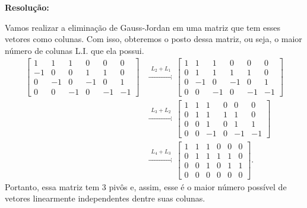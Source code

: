 \documentclass[leqno]{article}
\numberwithin{equation}{section}
\newenvironment{sol}
{
    \vspace{4mm}
    \noindent\textbf{Resolução:}
    \strut\newline
    \smallskip
    \hspace{-3.5mm}
}
{}
\begin{document}
\begin{enumerate}
        \begin{sol} 
            Vamos realizar a eliminação de Gauss-Jordan em uma matriz que tem esses vetores como colunas.
            Com isso, obteremos o posto dessa matriz, ou seja, o maior número de colunas L.I. que ela possui.
            \begin{align*}
                \begin{bmatrix}
                    1 & 1 & 1 & 0 & 0 & 0 \\
                    -1 & 0 & 0 & 1 & 1 & 0 \\
                    0 & -1 & 0 & -1 & 0 & 1 \\
                    0 & 0 & -1 & 0 & -1 & -1
                \end{bmatrix}
                &\xrightarrow{
                    \begin{array}{l}
                        L_{ 2 } + L_{ 1 }
                    \end{array}
                }
                \begin{bmatrix}
                    1 & 1 & 1 & 0 & 0 & 0 \\
                    0 & 1 & 1 & 1 & 1 & 0 \\
                    0 & -1 & 0 & -1 & 0 & 1 \\
                    0 & 0 & -1 & 0 & -1 & -1
                \end{bmatrix} \\
                &\xrightarrow{
                    \begin{array}{l}
                        L_{ 3 } + L_{ 2 }
                    \end{array}
                }
                \begin{bmatrix}
                    1 & 1 & 1 & 0 & 0 & 0 \\
                    0 & 1 & 1 & 1 & 1 & 0 \\
                    0 & 0 & 1 & 0 & 1 & 1 \\
                    0 & 0 & -1 & 0 & -1 & -1
                \end{bmatrix} \\
                &\xrightarrow{
                    \begin{array}{l}
                        L_{ 4 } + L_{ 3 }
                    \end{array}
                }
                \begin{bmatrix}
                    1 & 1 & 1 & 0 & 0 & 0 \\
                    0 & 1 & 1 & 1 & 1 & 0 \\
                    0 & 0 & 1 & 0 & 1 & 1 \\
                    0 & 0 & 0 & 0 & 0 & 0
                \end{bmatrix}
            .\end{align*}
            Portanto, essa matriz tem \( 3 \) pivôs e, assim, esse é o maior número possível de vetores linearmente independentes dentre suas colunas.
        \end{sol} 


\end{enumerate}
\end{document}
